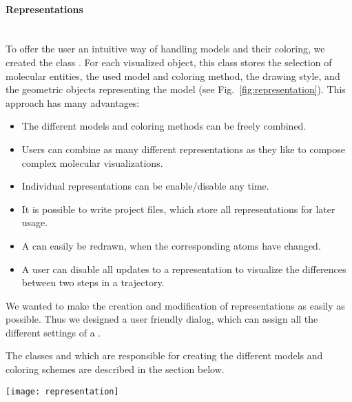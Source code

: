 \label{representation}
\paragraph{Representations}
\hspace*{\fill}\\
\noindent
To offer the user an intuitive way of handling models and their coloring, we 
created the class . For each visualized object, this 
class stores the selection of molecular entities, the used model and coloring 
method, the drawing style, and the geometric objects representing the model 
(see Fig.~\ref{fig:representation}). This approach has many advantages:
\begin{itemize}
  \item The different models and coloring methods can be freely combined.
  \item Users can combine as many different representations as they like to
        compose complex molecular visualizations.
  \item Individual representations can be enable/disable any time.
  \item It is possible to write project files, which store all representations
        for later usage.
  \item A  can easily be redrawn, when the corresponding
        atoms have changed.
  \item A user can disable all updates to a representation \eg to visualize the
        differences between two steps in a trajectory.
\end{itemize}

We wanted to make the creation and modification of representations as easily 
as possible. Thus we designed a user friendly dialog, which can assign all the 
different settings of a .

The classes  and  which are 
responsible for creating the different models and coloring schemes are 
described in the section below.

\begin{figure*}[ht] %
\centering
\texttt{[image: representation]}
\caption[UML diagram for the  class]
{Each visualized object corresponds to an instance of the class 
. The  creates 
, \eg tubes or meshes for all atoms stored in the
. Next, the  colorizes the 
, \eg by element, charge or temperature factor. The
individual model types and coloring methods are realized by derived classes.
This approach simplifies the creation of new models and coloring methods and 
allows their free combination.}
\label{fig:representation}
\end{figure*}

